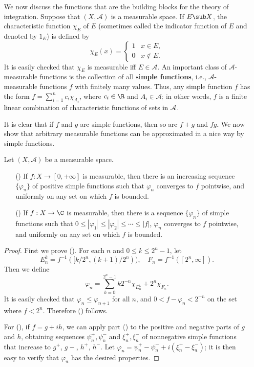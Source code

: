 We now discuss the functions that are the building blocks for the theory of integration. Suppose that $(X,\mathcal{A})$ is a measurable space. If $E\sub X$, the characteristic function $\chi_E$ of $E$ (sometimes called the indicator function of $E$ and denoted by $1_E$) is defined by
\[\chi_E(x)=\begin{cases}
1&x\in E,\\
0&x\notin E.
\end{cases}\]
It is easily checked that $\chi_E$ is measurable iff $E\in\mathcal{A}$. An important class of $\mathcal{A}$-measurable functions is the collection of all \textbf{simple functions}, i.e., $\mathcal{A}$-measurable functions $f$ with finitely many values. Thus, any simple function $f$ has the form $f=\sum_{i=1}^{n}c_i\chi_{A_i}$, where $c_i\in\R$ and $A_i\in\mathcal{A}$; in other words, $f$ is a finite linear combination of characteristic functions of sets in $\mathcal{A}$.\par
It is clear that if $f$ and $g$ are simple functions, then so are $f+g$ and $fg$. We now show that arbitrary measurable functions can be approximated in a nice way by simple functions.
\begin{proposition}\label{measurable positive function approximated simple}
Let $(X,\mathcal{A})$ be a measurable space.
\begin{itemize}
\item[(\rmnum{1})] If $f:X\to[0,+\infty]$ is measurable, then there is an increasing sequence $\{\varphi_n\}$ of positive simple functions such that $\varphi_n$ converges to $f$ pointwise, and uniformly on any set on which $f$ is bounded.
\item[(\rmnum{2})] If $f:X\to\C$ is measurable, then there is a sequence $\{\varphi_n\}$ of simple functions such that $0\leq|\varphi_1|\leq|\varphi_2|\leq\cdots\leq|f|$, $\varphi_n$ converges to $f$ pointwise, and uniformly on any set on which $f$ is bounded.
\end{itemize}
\end{proposition}
\begin{proof}
First we prove (). For each $n$ and $0\leq k\leq 2^{n}-1$, let
\[E_n^k=f^{-1}([k/2^n,(k+1)/2^n)),\quad F_n=f^{-1}([2^n,\infty]).\]
Then we define
\[\varphi_n=\sum_{k=0}^{2^n-1}k2^{-n}\chi_{E_n^k}+2^n\chi_{F_n}.\]
It is easily checked that $\varphi_n\leq\varphi_{n+1}$ for all $n$, and $0<f-\varphi_n<2^{-n}$ on the set where $f<2^n$. Therefore () follows.\par
For (), if $f=g+ih$, we can apply part () to the positive and negative parts of $g$ and $h$, obtaining sequences $\psi_n^+,\psi_n^-$ and $\xi_n^+,\xi_n^-$ of nonnegative simple functions that increase to $g^+$, $g-$, $h^+$, $h^-$. Let $\varphi_n=\psi_n^+-\psi_n^-+i(\xi_n^+-\xi_n^-)$; it is then easy to verify that $\varphi_n$ has the desired properties.
\end{proof}

